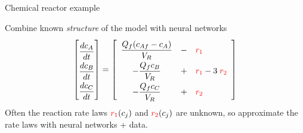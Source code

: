 \documentclass[xcolor=dvipsnames, 8pt]{beamer} %
\begin{document}
\begin{frame}{Chemical reactor example}

	\centerline{\resizebox{0.7\textwidth}{!}{}}
	\pause
	\begin{block}{Combine known \textit{structure} of the model with neural networks}
		\begin{equation*}
			\renewcommand{\arraystretch}{2}
			\begin{bmatrix} 
			\dfrac{dc_A}{dt} \\
			\dfrac{dc_B}{dt} \\
			\dfrac{dc_C}{dt}
			\end{bmatrix} = \begin{bmatrix}
	  \begin{array}{ccl}
			  \dfrac{Q_f(c_{Af} - c_A)}{V_R} &-& {\color{red} r_{1}} \\ 
			  -\dfrac{Q_fc_B}{V_R} &+& {\color{red} r_{1}} - 3\; {\color{red} r_{2}} \\
			  -\dfrac{Q_fc_C}{V_R} &+& \color{red}{r_{2}}
	  \end{array}
	  \end{bmatrix}
		  \end{equation*}
		  Often the reaction rate laws
		  ${\color{red}r_1}(c_j)$ and ${\color{red} r_2}(c_j)$ are unknown,
		  so approximate the rate laws with neural networks + data.
	\end{block}
\end{frame}
\end{document}
